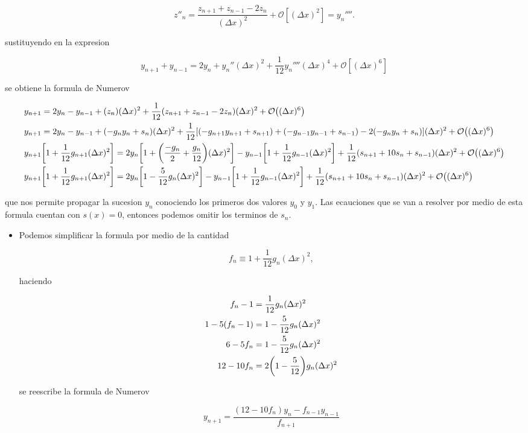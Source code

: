 \documentclass[11pt]{article}
\begin{document}
\[ z''_n = \frac{z_{n+1}+z_{n-1}-2z_n}{(\Delta x)^2} + \mathcal{O}[(\Delta x)^2] = y_n''''. \]

sustituyendo en la expresion

\[ y_{n+1} + y_{n-1} = 2y_n + y_n''(\Delta x)^2 + \frac{1}{12} y_n'''' (\Delta x)^4 + \mathcal{O} [(\Delta x)^6] \]

se obtiene la formula de Numerov

 \begin{align*}
  &y_{n+1} = 2y_n - y_{n-1} + (z_n)(\Delta x)^2 + \frac{1}{12}(z_{n+1}+z_{n-1}-2z_n)(\Delta x)^2 + \order{(\Delta x)^6} \\
  &y_{n+1} =  2y_n -y_{n-1} + (-g_ny_n + s_n) (\Delta x)^2 + \frac{1}{12}[(-g_{n+1}y_{n+1}+s_{n+1})+(-g_{n-1}y_{n-1}+s_{n-1})-2(-g_ny_n+s_n)](\Delta x)^2 + \order{(\Delta x)^6} \\
  &y_{n+1}\qty[1 + \frac{1}{12}g_{n+1}(\Delta x)^2] = 2y_n \qty[1+\qty(\frac{-g_n}{2}+\frac{g_n}{12})(\Delta x)^2] -y_{n-1}\qty[1+\frac{1}{12}g_{n-1}(\Delta x)^2] + \frac{1}{12}(s_{n+1}+10s_n+s_{n-1})(\Delta x)^2 + \order{(\Delta x)^6} \\
  &y_{n+1}\qty[1 + \frac{1}{12}g_{n+1}(\Delta x)^2] = 2y_n \qty[1-\frac{5}{12}g_n(\Delta x)^2] -y_{n-1}\qty[1+\frac{1}{12}g_{n-1}(\Delta x)^2] + \frac{1}{12}(s_{n+1}+10s_n+s_{n-1})(\Delta x)^2 + \order{(\Delta x)^6}
\end{align*}

que nos permite propagar la sucesion \(y_n\) conociendo los primeros dos valores \(y_0\) y \(y_1\). Las ecauciones que se van a resolver por medio de esta formula cuentan con \(s(x) = 0\), entonces podemos omitir los terminos de \(s_n\).

\begin{itemize}
\item Podemos simplificar la formula por medio de la cantidad

\[ f_n \equiv 1 + \frac{1}{12}g_n(\Delta x)^2, \]

haciendo

\begin{align*}
    f_n - 1 &= \frac{1}{12}g_n(\Delta x)^2 \\
    1-5(f_n -1) &= 1-\frac{5}{12}g_n(\Delta x)^2 \\
    6-5f_n &= 1-\frac{5}{12}g_n(\Delta x)^2 \\
    12-10f_n &= 2\qty(1-\frac{5}{12})g_n(\Delta x)^2
\end{align*}

se reescribe la formula de Numerov

\[ y_{n+1} = \frac{(12-10f_n)y_n-f_{n-1}y_{n-1}}{f_{n+1}} \]
\end{itemize}
\end{document}
